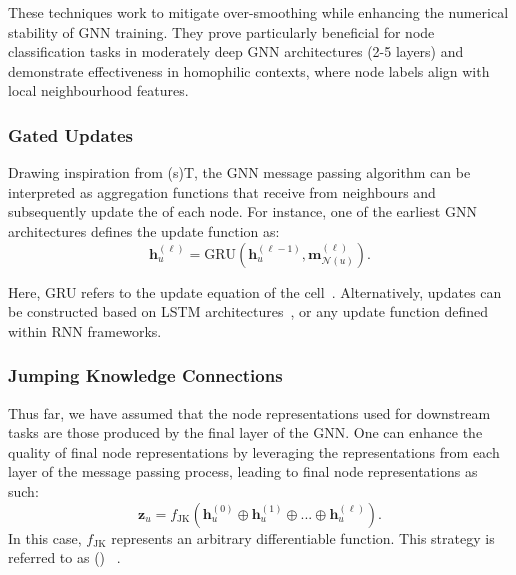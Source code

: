 \medskip
These techniques work to mitigate over-smoothing while enhancing the numerical stability of GNN training. They prove particularly beneficial for node classification tasks in moderately deep GNN architectures (2-5 layers) and demonstrate effectiveness in homophilic contexts, where node labels align with local neighbourhood features.

\subsubsection{Gated Updates}
Drawing inspiration from  (s)T, the GNN message passing algorithm can be interpreted as aggregation functions that receive  from neighbours and subsequently update the  of each node. For instance, one of the earliest GNN architectures defines the update function as:
\begin{equation*}
    \mathbf{h}_u^{(\ell)} = \text{GRU}(\mathbf{h}_u^{(\ell-1)}, \mathbf{m}_{\mathcal{N}(u)}^{(\ell)}).
\end{equation*}

Here, GRU refers to the update equation of the  cell~\cite{Cho2014learningPhraseRepresentations}. Alternatively, updates can be constructed based on LSTM architectures~\cite{selsam2018LearningSATSolverSingleBitSupervision}, or any update function defined within RNN frameworks.

\subsubsection{Jumping Knowledge Connections}
Thus far, we have assumed that the node representations used for downstream tasks are those produced by the final layer of the GNN.  One can enhance the quality of final node representations by leveraging the representations from each layer of the message passing process, leading to final node representations as such:
\begin{equation*}
    \mathbf{z}_u = f_\text{JK}(\mathbf{h}_u^{(0)} \oplus \mathbf{h}_u^{(1)} \oplus ... \oplus \mathbf{h}_u^{(\ell)}).
\end{equation*}
In this case, $ f_\text{JK} $ represents an arbitrary differentiable function. This strategy is referred to as  () ~\cite{xu2018RepresentationLearningGraphsJumpingKnowledgeNetworks}.

